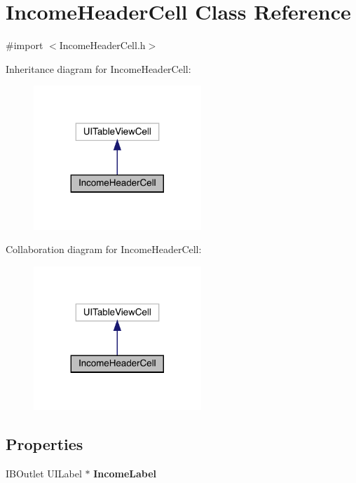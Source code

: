 \hypertarget{interface_income_header_cell}{}\section{Income\+Header\+Cell Class Reference}
\label{interface_income_header_cell}


{\ttfamily \#import $<$Income\+Header\+Cell.\+h$>$}



Inheritance diagram for Income\+Header\+Cell\+:\nopagebreak
\begin{figure}[H]
\begin{center}
\leavevmode
\includegraphics[width=179pt]{interface_income_header_cell__inherit__graph}
\end{center}
\end{figure}


Collaboration diagram for Income\+Header\+Cell\+:\nopagebreak
\begin{figure}[H]
\begin{center}
\leavevmode
\includegraphics[width=179pt]{interface_income_header_cell__coll__graph}
\end{center}
\end{figure}
\subsection*{Properties}
\begin{DoxyCompactItemize}
\item 
\mbox{\label{interface_income_header_cell_a4d90aea665184eb46905061a257e590f}} 
I\+B\+Outlet U\+I\+Label $\ast$ {\bfseries Income\+Label}
\end{DoxyCompactItemize}


